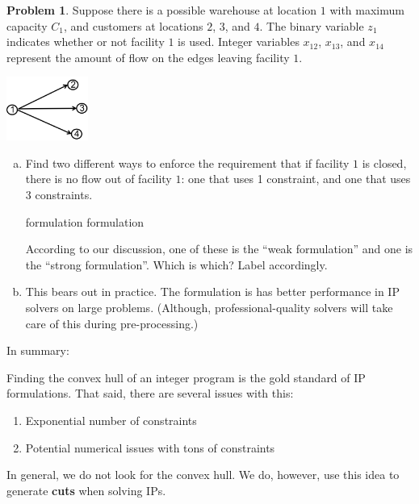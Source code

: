 \documentclass[11pt]{article}
\theoremstyle{definition}
\newtheorem{problem}{Problem}
\newcommand{\answerbox}[3]{%
  \fbox{%
    \begin{minipage}[#1]{#2}
      \hfill\vspace{#3}
    \end{minipage}
  }
}
\newcommand{\wordbox}{\answerbox{c}{1.2in}{.7cm}}
\begin{document}
\begin{problem}
Suppose there is a possible warehouse at location $1$ with maximum capacity $C_1$, and customers at locations $2$, $3$, and $4$.  The binary variable $z_1$ indicates whether or not facility $1$ is used.  Integer variables $x_{12}$, $x_{13}$, and $x_{14}$ represent the amount of flow on the edges leaving facility $1$.  

\begin{center}
\includegraphics[width=0.2\textwidth]{facility_location}
\end{center}

\begin{enumerate}[(a)]
\item Find two different ways to enforce the requirement that if facility $1$ is closed, there is no flow out of facility $1$: one that uses 1 constraint, and one that uses 3 constraints.  

\medskip
\answerbox{c}{6cm}{3cm}  \hspace{.8cm} \answerbox{c}{6cm}{3cm}

\wordbox formulation \hspace{1.8cm}  \wordbox formulation

\medskip
According to our discussion,  one of these is the ``weak formulation'' and one is the ``strong formulation''.  Which is which?  Label accordingly.


\item  This bears out in practice.  The \wordbox formulation is has better performance in IP solvers on large problems.  (Although, professional-quality solvers will take care of this during pre-processing.)
\end{enumerate}
\end{problem}

\vfill
In summary:
\begin{tcolorbox}
Finding the convex hull of an integer program is the gold standard of IP formulations. That said, there are several issues with this:
	\begin{enumerate}
	\item Exponential number of constraints
	\item Potential numerical issues with tons of constraints
	\end{enumerate}
In general, we do not look for the convex hull. We do, however, use this idea to generate \textbf{cuts} when solving IPs.
\end{tcolorbox}
\end{document}
